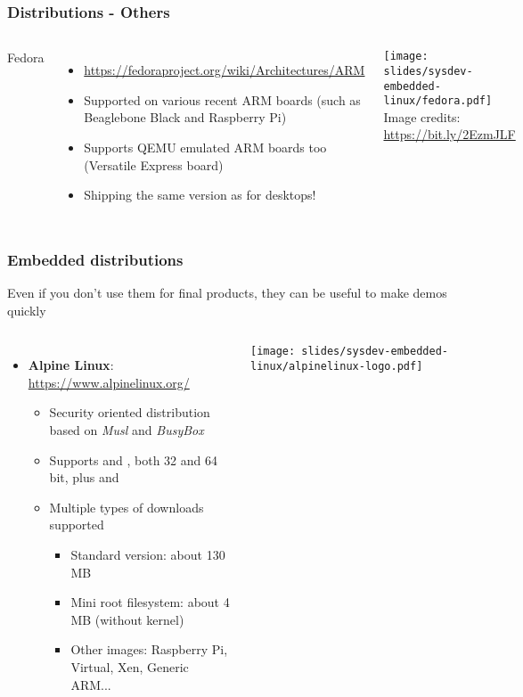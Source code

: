 \begin{frame}
  \frametitle{Distributions - Others}
  \begin{columns}[T]
    Fedora
    \begin{itemize}
    \item \url{https://fedoraproject.org/wiki/Architectures/ARM}
    \item Supported on various recent ARM boards (such as Beaglebone
      Black and Raspberry Pi)
    \item Supports QEMU emulated ARM boards too (Versatile Express board)
    \item Shipping the same version as for desktops!
    \end{itemize}
    \texttt{[image: slides/sysdev-embedded-linux/fedora.pdf]}\\
    \tiny Image credits: \url{https://bit.ly/2EzmJLF}
  \end{columns}
\end{frame}

\begin{frame}
  \frametitle{Embedded distributions}
  Even if you don't use them for final products, they can be useful
  to make demos quickly
  \small
  \begin{columns}
    \begin{itemize}
    \item {\bf Alpine Linux}: \url{https://www.alpinelinux.org/}\\
      \begin{itemize}
      \item Security oriented distribution based on {\em Musl} and {\em BusyBox}
      \item Supports  and , both 32 and 64 bit, plus
             and 
      \item Multiple types of downloads supported
	    \begin{itemize}
	    \item Standard version: about 130 MB
	    \item Mini root filesystem: about 4 MB (without kernel)
	    \item Other images: Raspberry Pi, Virtual, Xen, Generic ARM...
	    \end{itemize}
      \end{itemize}
    \end{itemize}
    \texttt{[image: slides/sysdev-embedded-linux/alpinelinux-logo.pdf]}\\
  \end{columns}
\end{frame}

